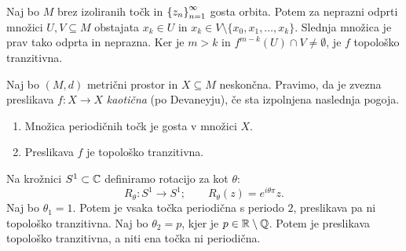 \begin{dokaz}
    Naj bo \(M\) brez izoliranih točk in \(\left\{ z_n \right\}_{n = 1}^{\infty}\) gosta orbita. Potem za neprazni odprti množici \(U, V \subseteq M\) obstajata \(x_k \in U\) in \(x_k \in V \setminus \{x_0, x_1, \dots, x_k\}\). Slednja množica je prav tako odprta in neprazna. Ker je \(m > k\) in \(f^{m - k} (U) \cap V \neq \emptyset\), je \(f\) topološko tranzitivna.

\end{dokaz}

\begin{definicija}
    Naj bo \((M, d)\) metrični prostor in \(X \subseteq M\) neskončna. Pravimo, da je zvezna preslikava \(f \colon X \to X\) \emph{kaotična} (po Devaneyju), če sta izpolnjena naslednja pogoja.
    \begin{enumerate}
        \item Množica periodičnih točk je gosta v množici \(X\).
        \item Preslikava \(f\) je topološko tranzitivna.
    \end{enumerate}
\end{definicija}

\begin{zgled}
    Na krožnici \(S^1 \subset \mathbb C\) definiramo rotacijo za kot \(\theta\):
    \[R_\theta \colon S^1 \to S^1; \qquad R_\theta (z) = e^{i \theta \pi} z.\]
    Naj bo \(\theta_1 = 1\). Potem je vsaka točka periodična s periodo \(\num{2}\), preslikava pa ni topološko  tranzitivna. Naj bo \(\theta_2 = p\), kjer je \(p \in \mathbb R \setminus \mathbb Q\). Potem je preslikava topološko tranzitivna, a niti ena točka ni periodična.
\end{zgled}

